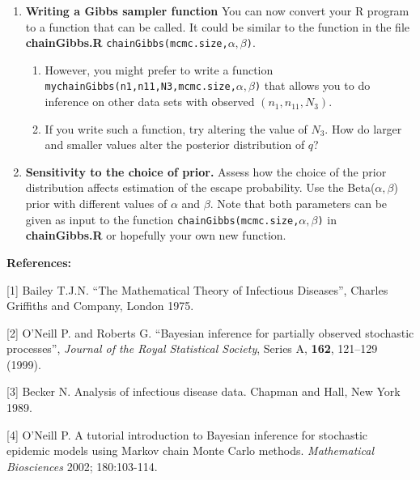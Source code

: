 \documentclass[11pt]{article}
\begin{document}
\begin{enumerate}

\item {\bf Writing a  Gibbs sampler function} You can now convert your R program to a function 
that can be called.  It could be similar to the function in the file  {\bf chainGibbs.R} 
{\tt chainGibbs(mcmc.size,$\alpha,\beta$)}. 

\begin{enumerate}
\item However, you might prefer to write a function 
{\tt mychainGibbs(n1,n11,N3,mcmc.size,$\alpha,\beta$)} that allows you to do inference on other data 
sets with observed $(n_{1},n_{11},N_{3})$. 
\item If you write such a function, try altering the value of $N_{3}$. How do larger and smaller values alter the posterior distribution of 
$q$?
\end{enumerate}
\item {\bf Sensitivity to the choice of prior.} 
Assess how the choice of the prior distribution affects estimation
of the escape probability. Use the Beta($\alpha,\beta$) prior with 
different values of $\alpha$ and $\beta$. Note that both parameters can be
given as input to the function {\tt chainGibbs(mcmc.size,$\alpha,\beta$)} in {\bf chainGibbs.R} or 
hopefully your own new function. 
\end{enumerate}

\vskip 11pt
{\bf References:} 

[1] Bailey T.J.N. ``The Mathematical Theory of Infectious Diseases'',
Charles Griffiths and Company, London 1975.

[2] O'Neill P. and Roberts G. ``Bayesian inference for partially observed stochastic processes'', {\it Journal of the Royal Statistical Society}, Series A, {\bf 162}, 121--129 (1999).

[3] Becker N. Analysis of infectious disease data. Chapman and Hall, New York 1989.

[4] O'Neill P. A tutorial introduction to Bayesian inference for
stochastic epidemic models using Markov chain Monte Carlo methods.
{\it Mathematical Biosciences} 2002; 180:103-114.
\end{document}
